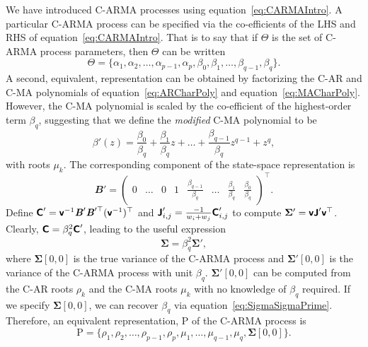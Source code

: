 \documentclass[a4paper,fleqn,usenatbib]{mnras}
\newcommand{\Rho}{\mathrm{P}}
\begin{document}
We have introduced C-ARMA processes using equation~\eqref{eq:CARMAIntro}. A particular C-ARMA process can be specified via the co-efficients of the LHS and RHS of equation~\eqref{eq:CARMAIntro}. That is to say that if $\Theta$ is the set of C-ARMA process parameters, then $\Theta$ can be written
\begin{equation}\label{eq:Theta}
\Theta = \{ \alpha_{1}, \alpha_{2}, \ldots, \alpha_{p-1}, \alpha_{p}, \beta_{0}, \beta_{1}, \ldots, \beta_{q-1}, \beta_{q} \}.
\end{equation}
A second, equivalent, representation can be obtained by factorizing the C-AR and C-MA polynomials of equation~\eqref{eq:ARCharPoly} and equation~\eqref{eq:MACharPoly}. However, the C-MA polynomial is scaled by the co-efficient of the highest-order term $\beta_{q}$, suggesting that we define the \textit{modified} C-MA polynomial to be 
\begin{equation}\label{eq:modMACharPoly}
\beta'(z) = \frac{\beta_{0}}{\beta_{q}} + \frac{\beta_{1}}{\beta_{q}} z + \ldots + \frac{\beta_{q-1}}{\beta_{q}} z^{q-1} + z^{q},
\end{equation}
with roots $\mu_{k}$. The corresponding component of the state-space representation is
\begin{equation}\label{eq:BPrime}
\mathbfit{B}' = \left( \begin{array}{cccccccc} 0 & \hdots & 0 & 1 & \frac{\beta_{q-1}}{\beta_{q}} & \hdots & \frac{\beta_{1}}{\beta_{q}} & \frac{\beta_{0}}{\beta_{q}} \end{array} \right)^{\top}.
\end{equation}
Define $\textbf{\textsf{C}}' = \textbf{\textsf{v}}^{-1}\textbf{\textit{B}}'\textbf{\textit{B}}'^{\top}(\textbf{\textsf{v}}^{-1})^{\top}$ and $\textbf{\textsf{J}}'_{i,j} = \frac{ - 1}{w_{i} + w_{j}}\textbf{\textsf{C}}'_{i,j}$ to compute $\boldsymbol{\Sigma}' = \textbf{\textsf{v}}\textbf{\textsf{J}}'\textbf{\textsf{v}}^{\top}$. Clearly, $\textbf{\textsf{C}} = \beta_{q}^{2}\textbf{\textsf{C}}'$, leading to the useful expression
\begin{equation}\label{eq:SigmaSigmaPrime}
\boldsymbol{\Sigma} = \beta_{q}^{2}\boldsymbol{\Sigma}',
\end{equation}
where $\boldsymbol{\Sigma}[0,0]$ is the true variance of the C-ARMA process and $\boldsymbol{\Sigma}'[0,0]$ is the variance of the C-ARMA process with unit $\beta_{q}$. $\boldsymbol{\Sigma}'[0,0]$ can be computed from the C-AR roots $\rho_{k}$ and the C-MA roots $\mu_{k}$ with no knowledge of $\beta_{q}$ required. If we specify $\boldsymbol{\Sigma}[0,0]$, we can recover $\beta_{q}$ via equation~\eqref{eq:SigmaSigmaPrime}. Therefore, an equivalent representation, $\Rho$ of the C-ARMA process is
\begin{equation}\label{eq:Rho}
\Rho = \{ \rho_{1}, \rho_{2}, \ldots, \rho_{p-1}, \rho_{p}, \mu_{1}, \ldots, \mu_{q-1}, \mu_{q}, \boldsymbol{\Sigma}[0,0] \}.
\end{equation}
\end{document}
